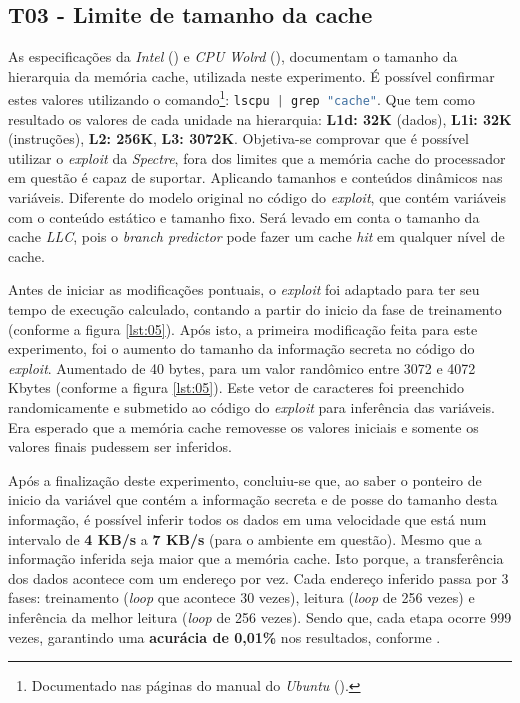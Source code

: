 \documentclass[
	article,			    %
	12pt,				    %
	oneside,			    %
	a4paper,			    %
	chapter=TITLE,		    %
	section=TITLE,		    %
	subsection=TITLE,	    %
	english,			    %
	brazil,				    %
	sumario=tradicional
]{abntex2}
\begin{document}
\begin{comment}
explicar mais sobre o que é "contexto" nesse sentindo
\end{comment}

\subsection{T03 - Limite de tamanho da cache}
As especificações da \emph{Intel} (\citeyear{Intel2019Corei3}) e \emph{CPU Wolrd} (\citeyear{CPU2016Corei3}), documentam o tamanho da hierarquia da memória cache, utilizada neste experimento. É possível confirmar estes valores utilizando o comando\footnote{Documentado nas páginas do manual do \emph{Ubuntu} (\citeyear{Ubuntu2019Lscpu}).}: \lstinline[language=C, style=c]{lscpu | grep "cache"}. Que tem como resultado os valores de cada unidade na hierarquia: \textbf{L1d: 32K} (dados), \textbf{L1i: 32K} (instruções), \textbf{L2: 256K}, \textbf{L3: 3072K}. Objetiva-se comprovar que é possível utilizar o \emph{exploit} da \emph{Spectre}, fora dos limites que a memória cache do processador em questão é capaz de suportar. Aplicando tamanhos e conteúdos dinâmicos nas variáveis. Diferente do modelo original no código do \emph{exploit}, que contém variáveis com o conteúdo estático e tamanho fixo. Será levado em conta o tamanho da cache \emph{LLC}, pois o \emph{branch predictor} pode fazer um cache \emph{hit} em qualquer nível de cache.

Antes de iniciar as modificações pontuais, o \emph{exploit} foi adaptado para ter seu tempo de execução calculado, contando a partir do inicio da fase de treinamento (conforme a figura \ref{lst:05}). Após isto, a primeira modificação feita para este experimento, foi o aumento do tamanho da informação secreta no código do \emph{exploit}. Aumentado de 40 bytes, para um valor randômico entre 3072 e 4072 Kbytes (conforme a figura \ref{lst:05}). Este vetor de caracteres foi preenchido randomicamente e submetido ao código do \emph{exploit} para inferência das variáveis. Era esperado que a memória cache removesse os valores iniciais e somente os valores finais pudessem ser inferidos.



Após a finalização deste experimento, concluiu-se que, ao saber o ponteiro de inicio da variável que contém a informação secreta e de posse do tamanho desta informação, é possível inferir todos os dados em uma velocidade que está num intervalo de \textbf{4 KB/s} a \textbf{7 KB/s} (para o ambiente em questão). Mesmo que a informação inferida seja maior que a memória cache. Isto porque, a transferência dos dados acontece com um endereço por vez. Cada endereço inferido passa por 3 fases: treinamento (\emph{loop} que acontece 30 vezes), leitura (\emph{loop} de 256 vezes) e inferência da melhor leitura (\emph{loop} de 256 vezes). Sendo que, cada etapa ocorre 999 vezes, garantindo uma \textbf{acurácia de 0,01\%} nos resultados, conforme .
\end{document}
